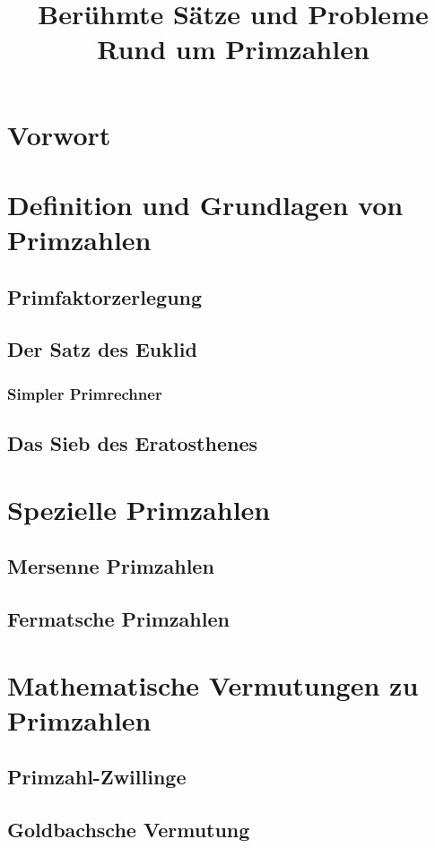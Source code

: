 \documentclass[11pt]{article}
\begin{document}
\title{Berühmte Sätze und Probleme Rund um Primzahlen}
\tableofcontents
\newpage
\section*{Vorwort}

\newpage
\section{Definition und Grundlagen von Primzahlen}

\subsection{Primfaktorzerlegung}

\newpage
\subsection{Der Satz des Euklid}
\newpage
\subsubsection{Simpler Primrechner}

\newpage
\subsection{Das Sieb des Eratosthenes}
\section{Spezielle Primzahlen}
\subsection{Mersenne Primzahlen}
\subsection{Fermatsche Primzahlen}
\section{Mathematische Vermutungen zu Primzahlen}
\subsection{Primzahl-Zwillinge}
\subsection{Goldbachsche Vermutung}
\end{document}
